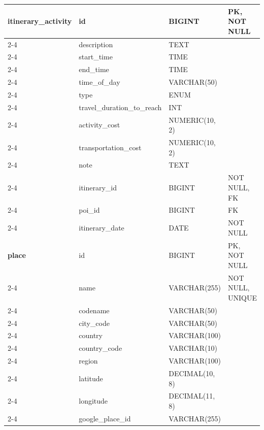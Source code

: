 {\begin{longtable}{|p{2.5cm}|p{3.8cm}|p{3.8cm}|p{4.2cm}|}
\textbf{itinerary\_\newline activity} 
    & id & BIGINT & PK, NOT NULL \\ \cline{2-4} 
    & description & TEXT & \\ \cline{2-4} 
    & start\_time & TIME & \\ \cline{2-4} 
    & end\_time & TIME & \\ \cline{2-4}
    & time\_of\_day & VARCHAR(50) & \\ \cline{2-4} 
    & type & ENUM & \\ \cline{2-4} 
    & travel\_duration\_\newline to\_reach & INT & \\ \cline{2-4} 
    & activity\_cost & NUMERIC(10, 2) & \\ \cline{2-4} 
    & transportation\_cost & NUMERIC(10, 2) & \\ \cline{2-4} 
    & note & TEXT & \\ \cline{2-4} 
    & itinerary\_id & BIGINT & NOT NULL, FK \\ \cline{2-4} 
    & poi\_id & BIGINT & FK \\ \cline{2-4}
    & itinerary\_date & DATE & NOT NULL \\ \hline

\textbf{place} 
    & id & BIGINT & PK, NOT NULL \\ \cline{2-4} 
    & name & VARCHAR(255) & NOT NULL, UNIQUE \\ \cline{2-4} 
    & codename & VARCHAR(50) & \\ \cline{2-4} 
    & city\_code & VARCHAR(50) & \\ \cline{2-4} 
    & country & VARCHAR(100) & \\ \cline{2-4} 
    & country\_code & VARCHAR(10) & \\ \cline{2-4}
    & region & VARCHAR(100) & \\ \cline{2-4} 
    & latitude & DECIMAL(10, 8) & \\ \cline{2-4} 
    & longitude & DECIMAL(11, 8) & \\ \cline{2-4} 
    & google\_place\_id & VARCHAR(255) & \\ \hline


\end{longtable}}
